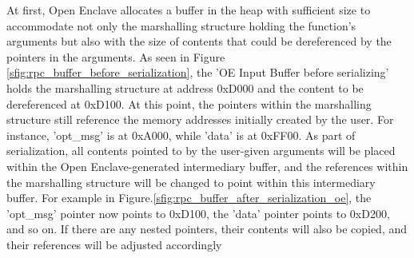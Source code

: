 \documentclass[article, doublespace,nopageskip]{VTthesis} %
\begin{document}

    At first, Open Enclave allocates a buffer in the heap with sufficient size to accommodate not only the marshalling structure holding the function's arguments but also with                the size of contents that could be dereferenced by the pointers in the arguments. As seen in Figure \ref{sfig:rpc_buffer_before_serialization}, the 'OE Input Buffer before serializing' holds the marshalling structure at address 0xD000 and the content to be dereferenced at 0xD100. At this point, the pointers within the marshalling structure still reference the memory addresses initially created by the user. For instance, 'opt\_msg' is at 0xA000, while 'data' is at 0xFF00. As part of serialization, all contents pointed to by the user-given arguments will be placed within the Open Enclave-generated intermediary buffer, and the references within the marshalling structure will be changed to point within this intermediary buffer. For example in Figure.\ref{sfig:rpc_buffer_after_serialization_oe}, the 'opt\_msg' pointer now points to 0xD100, the 'data' pointer points to 0xD200, and so on. If there are any nested pointers, their contents will also be copied, and their references will be adjusted accordingly
\end{document}
